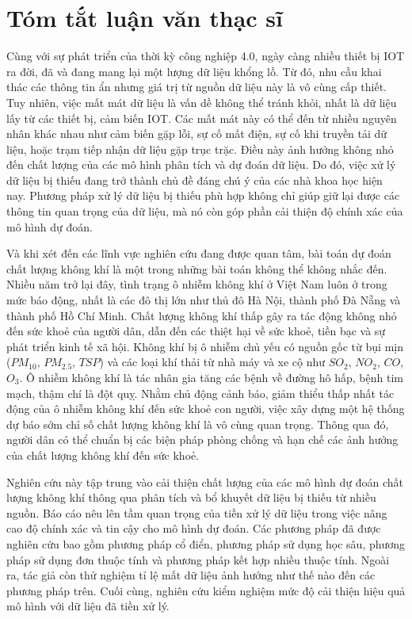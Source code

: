 \chapter*{Tóm tắt luận văn thạc sĩ}
Cùng với sự phát triển của thời kỳ công nghiệp 4.0, ngày càng nhiều thiết bị IOT ra đời, đã và đang mang lại một lượng dữ liệu khổng lồ. Từ đó, nhu cầu khai thác các thông tin ẩn nhưng giá trị từ nguồn dữ liệu này là vô cùng cấp thiết. Tuy nhiên, việc mất mát dữ liệu là vấn dề không thể tránh khỏi, nhất là dữ liệu lấy từ các thiết bị, cảm biến IOT. Các mất mát này có thể đến từ nhiều nguyên nhân khác nhau như cảm biến gặp lỗi, sự cố mất điện, sự cố khi truyền tải dữ liệu, hoặc trạm tiếp nhận dữ liệu gặp trục trặc. Điều này ảnh hưởng không nhỏ đến chất lượng của các mô hình phân tích và dự đoán dữ liệu. Do đó, việc xử lý dữ liệu bị thiếu đang trở thành chủ đề đáng chú ý của các nhà khoa học hiện nay. Phương pháp xử lý dữ liệu bị thiếu phù hợp không chỉ giúp giữ lại được các thông tin quan trọng của dữ liệu, mà nó còn góp phần cải thiện độ chính xác của mô hình dự đoán.

Và khi xét đến các lĩnh vực nghiên cứu đang được quan tâm, bài toán dự đoán chất lượng không khí là một trong những bài toán không thể không nhắc đến. Nhiều năm trở lại đây, tình trạng ô nhiễm không khí ở Việt Nam luôn ở trong mức báo động, nhất là các đô thị lớn như thủ đô Hà Nội, thành phố Đà Nẵng và thành phố Hồ Chí Minh. Chất lượng không khí thấp gây ra tác động không nhỏ đến sức khoẻ của người dân, dẫn đến các thiệt hại về sức khoẻ, tiền bạc và sự phát triển kinh tế xã hội. Không khí bị ô nhiễm chủ yếu có nguồn gốc từ bụi mịn ($PM_{10}$, $PM_{2.5}$, $TSP$) và các loại khí thải từ nhà máy và xe cộ như $SO_2$, $NO_2$, $CO$, $O_3$. Ô nhiễm không khí là tác nhân gia tăng các bệnh về đường hô hấp, bệnh tim mạch, thậm chí là đột quỵ. Nhằm chủ động cảnh báo, giảm thiểu thấp nhất tác động của ô nhiễm không khí đến sức khoẻ con người, việc xây dựng một hệ thống dự báo sớm chỉ số chất lượng không khí là vô cùng quan trọng. Thông qua đó, người dân có thể chuẩn bị các biện pháp phòng chống và hạn chế các ảnh hưởng của chất lượng không khí đến sức khoẻ.

Nghiên cứu này tập trung vào cải thiện chất lượng của các mô hình dự đoán chất lượng không khí thông qua phân tích và bổ khuyết dữ liệu bị thiếu từ nhiều nguồn. Báo cáo nêu lên tầm quan trọng của tiền xử lý dữ liệu trong việc nâng cao độ chính xác và tin cậy cho mô hình dự đoán. Các phương pháp đã được nghiên cứu bao gồm phương pháp cổ điển, phương pháp sử dụng học sâu, phương pháp sử dụng đơn thuộc tính và phương pháp kết hợp nhiều thuộc tính. Ngoài ra, tác giả còn thử nghiệm tỉ lệ mất dữ liệu ảnh hưởng như thế nào đến các phương pháp trên. Cuối cùng, nghiên cứu kiểm nghiệm mức độ cải thiện hiệu quả mô hình với dữ liệu đã tiền xử lý.